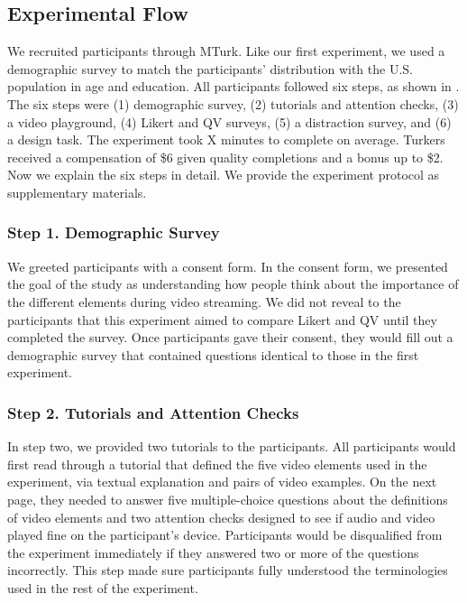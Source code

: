 \subsection{Experimental Flow}

We recruited participants through MTurk. Like our first experiment, we used a demographic survey to match the participants' distribution with the U.S. population in age and education. All participants followed six steps, as shown in . The six steps were (1) demographic survey, (2) tutorials and attention checks, (3) a video playground, (4) Likert and QV surveys, (5) a distraction survey, and (6) a design task. The experiment took X minutes to complete on average. Turkers received a compensation of \$6 given quality completions and a bonus up to \$2. Now we explain the six steps in detail. We provide the experiment protocol as supplementary materials.

\subsubsection{Step 1. Demographic Survey}
We greeted participants with a consent form. In the consent form, we presented the goal of the study as understanding how people think about the importance of the different elements during video streaming. We did not reveal to the participants that this experiment aimed to compare Likert and QV until they completed the survey. Once participants gave their consent, they would fill out a demographic survey that contained questions identical to those in the first experiment.

\subsubsection{Step 2. Tutorials and Attention Checks}
In step two, we provided two tutorials to the participants. All participants would first read through a tutorial that defined the five video elements used in the experiment, via textual explanation and pairs of video examples. On the next page, they needed to answer five multiple-choice questions about the definitions of video elements and two attention checks designed to see if audio and video played fine on the participant's device. Participants would be disqualified from the experiment immediately if they answered two or more of the questions incorrectly. This step made sure participants fully understood the terminologies used in the rest of the experiment.

